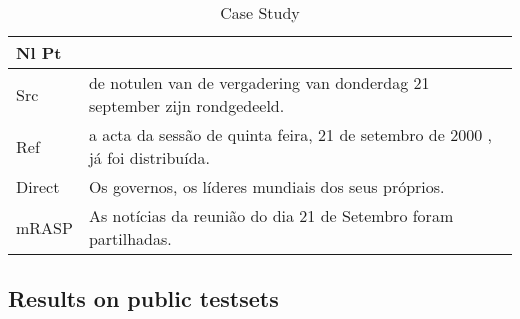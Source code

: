 \documentclass[11pt,a4paper]{article}
\begin{document}
\begin{CJK}{UTF8}{gkai}
\begin{table*}[t]
\begin{center}
\begin{tabular}{ll}
\midrule

Nl Pt &  \\
\midrule
Src & de notulen van de vergadering van donderdag 21 september zijn rondgedeeld. \\
Ref & a acta da sessão de quinta feira, 21 de setembro de 2000 , já foi distribuída. \\
Direct & Os governos, os líderes mundiais dos seus próprios. \\
mRASP & As notícias da reunião do dia 21 de Setembro foram partilhadas. \\

\bottomrule
\end{tabular}
\caption{Case Study}
\label{case-en2fr}
\end{center}
\end{table*}

 \end{CJK}

\subsection{Results on public testsets}
\end{document}
